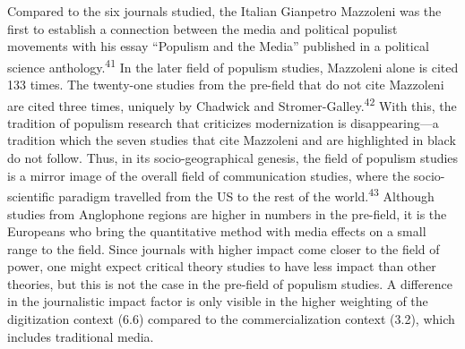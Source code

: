 \documentclass{tufte-handout}
\begin{document}
Compared to the six journals studied, the Italian Gianpetro Mazzoleni
was the first to establish a connection between the media and political
populist movements with his essay ``Populism and the Media'' published
in a political science anthology.\textsuperscript{41}
In the later field of populism studies, Mazzoleni alone is cited 133
times. The twenty-one studies from the pre-field that do not cite
Mazzoleni are cited three times, uniquely by Chadwick and
Stromer-Galley.\textsuperscript{42} With this, the tradition of populism research
that criticizes modernization is disappearing---a tradition which the
seven studies that cite Mazzoleni and are highlighted in black do not
follow. Thus, in its socio-geographical genesis, the field of populism
studies is a mirror image of the overall field of communication studies,
where the socio-scientific paradigm travelled from the US to the rest of
the world.\textsuperscript{43} Although studies from Anglophone regions are
higher in numbers in the pre-field, it is the Europeans who bring the
quantitative method with media effects on a small range to the field.
Since journals with higher impact come closer to the field of power, one
might expect critical theory studies to have less impact than other
theories, but this is not the case in the pre-field of populism studies.
A difference in the journalistic impact factor is only visible in the
higher weighting of the digitization context (6.6) compared to the
commercialization context (3.2), which includes traditional media.
\end{document}
